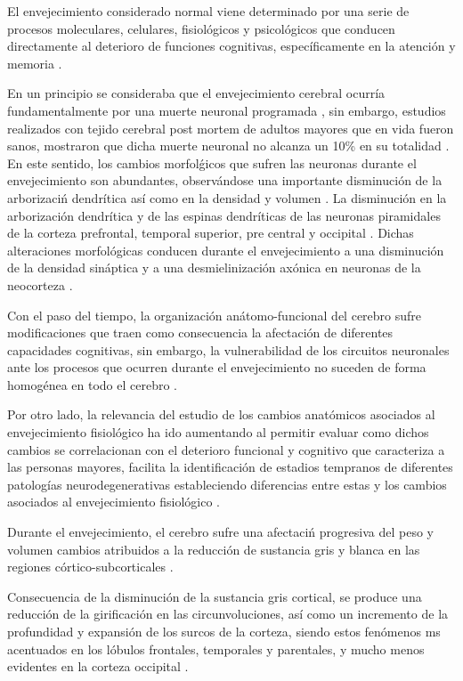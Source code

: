 El envejecimiento considerado normal viene determinado por una serie de procesos moleculares, 
celulares, fisiol\'ogicos y psicol\'ogicos que conducen directamente al deterioro de funciones 
cognitivas, específicamente en la atenci\'on y memoria \cite{Navarrete03,Park09}.

En un principio se consideraba que el envejecimiento cerebral ocurr\'ia fundamentalmente por una 
muerte neuronal programada \cite{Coleman87}, sin embargo, estudios realizados con tejido cerebral 
post mortem de adultos mayores que en vida fueron sanos, mostraron que dicha muerte neuronal no 
alcanza un 10\% en su totalidad \cite{Esiri07}. En este sentido, los cambios morfol\'gicos que 
sufren las neuronas durante el envejecimiento son abundantes, observ\'andose una importante 
disminuci\'on de la arborizaci\'n dendr\'itica as\'i como en la densidad y volumen \cite{Hita14}. 
La disminución en la arborización dendr\'itica y de las espinas dendr\'iticas de las neuronas 
piramidales de la corteza prefrontal, temporal superior, pre central y occipital \cite{Hita14}. 
Dichas alteraciones morfol\'ogicas conducen durante el envejecimiento a una disminuci\'on de 
la densidad sin\'aptica y a una desmielinizaci\'on ax\'onica en neuronas de la 
neocorteza \cite{Terry}.

Con el paso del tiempo, la organizaci\'on an\'atomo-funcional del cerebro sufre modificaciones 
que traen como consecuencia la afectaci\'on de diferentes capacidades cognitivas, sin embargo, 
la vulnerabilidad de los circuitos neuronales ante los procesos que ocurren durante el 
envejecimiento no suceden de forma homogénea en todo el cerebro \cite{Hita14}.

Por otro lado, la relevancia del estudio de los cambios anat\'omicos asociados al envejecimiento 
fisiol\'ogico ha ido aumentando al permitir evaluar como dichos cambios se correlacionan con 
el deterioro funcional y cognitivo que caracteriza a las personas mayores, facilita la 
identificaci\'on de estadios tempranos de diferentes patolog\'ias neurodegenerativas estableciendo 
diferencias entre estas y los cambios asociados al envejecimiento fisiol\'ogico \cite{Hita14}.

Durante el envejecimiento, el cerebro sufre una afectaci\'n progresiva del peso \cite{Dekaban78} 
y volumen \cite{Hubbard81} cambios atribuidos a la reducci\'on de sustancia gris y blanca en
las regiones c\'ortico-subcorticales \cite{Hita14}.

Consecuencia de la disminuci\'on de la sustancia gris cortical, se produce una reducci\'on de 
la girificaci\'on en las circunvoluciones, as\'i como un incremento de la profundidad y 
expansi\'on de los surcos de la corteza, siendo estos fen\'omenos ms acentuados en los l\'obulos 
frontales, temporales y parentales, y mucho menos evidentes en la corteza occipital \cite{Raz05}.

